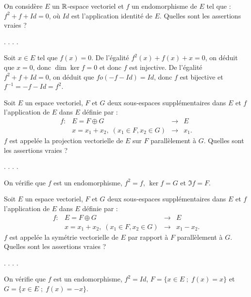 \begin{question}
On considère $E$ un $\mathbb{R}$-espace vectoriel et $f$ un endomorphisme de $E$ tel que : $f^2+f+Id = 0$, où $Id$ est l'application identité de $E$. Quelles sont les assertions vraies ?
\begin{answers} 
.
.
.
.
\end{answers}
\begin{explanations} Soit $x\in E$ tel que $f(x)=0$. De l'égalité  $f^2(x)+f(x)+x = 0$, on déduit que $x=0$, donc $\dim \ker f = 0$ et donc $f$ est injective.
\vskip0mm
De l'égalité  $f^2+f+Id = 0$, on déduit que $fo(-f-Id)=Id$, donc $f$ est bijective et $f^{-1}=-f-Id=f^2$.
\end{explanations}
\end{question}

\begin{question}
Soit $E$ un espace vectoriel, $F$ et $G$ deux sous-espaces supplémentaires dans $E$ et $f$ l'application de $E$ dans $E$ définie par : $$\begin{array}{rccc}f:&E=F\oplus G&\to&E\\
& x=x_1+x_2, \; (x_1\in F, x_2 \in G)&\to &x_1.  \end{array}$$ 
$f$ est appelée la projection vectorielle de $E$ sur $F$ parallèlement à $G$. Quelles sont les assertions vraies ?
\begin{answers}  
.
.
.
.  
\end{answers}
\begin{explanations} On vérifie que $f$ est un endomorphisme, $f^2=f$, $\ker f=G$ et $\Im f=F$.
\end{explanations}
\end{question}

\begin{question}
Soit $E$ un espace vectoriel, $F$ et $G$ deux sous-espaces supplémentaires dans $E$ et $f$ l'application de $E$ dans $E$ définie par : $$\begin{array}{rccc}f:&E=F\oplus G&\to&E\\
& x=x_1+x_2, \; (x_1\in F, x_2 \in G)&\to &x_1-x_2.  \end{array}$$ 
$f$ est appelée la symétrie vectorielle de $E$ par rapport à $F$ parallèlement à $G$. Quelles sont les assertions vraies ?
\begin{answers}  
.
.
.
.
\end{answers}
\begin{explanations} On vérifie que $f$ est un endomorphisme, $f^2=Id$, $F=\{x\in E \; ; \; f(x)=x\}$ et $G=\{x\in E \; ; \; f(x)=-x\}$.
\end{explanations}
\end{question}

